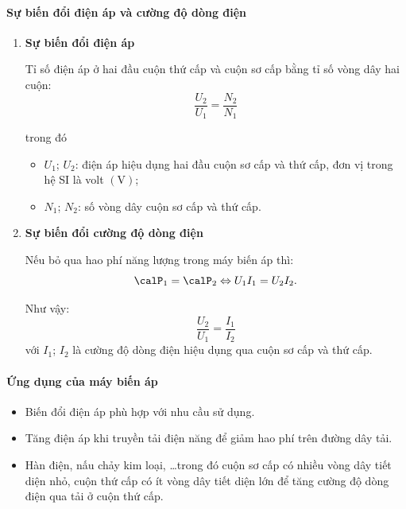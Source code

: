 \begin{tomtat}
	\paragraph{Sự biến đổi điện áp và cường độ dòng điện}
	\begin{enumerate}[label=\bfseries \alph*)]
		\item \textbf{Sự biến đổi điện áp}\\
		\begin{boxdl}
			Tỉ số điện áp ở hai đầu cuộn thứ cấp và cuộn sơ cấp bằng tỉ số vòng dây hai cuộn:
			\begin{equation}
				\dfrac{U_2}{U_1}=\dfrac{N_2}{N_1}
			\end{equation}
		\end{boxdl}
		trong đó
		\begin{itemize}
			\item $U_1$; $U_2$: điện áp hiệu dụng hai đầu cuộn sơ cấp và thứ cấp, đơn vị trong hệ SI là volt $\left(\si{\volt}\right)$;
			\item $N_1$; $N_2$: số vòng dây cuộn sơ cấp và thứ cấp.
		\end{itemize}
		\item \textbf{Sự biến đổi cường độ dòng điện}\\
	\begin{boxdl}
		Nếu bỏ qua hao phí năng lượng trong máy biến áp thì:
		$$\calP_1=\calP_2\Leftrightarrow U_1I_1=U_2I_2.$$
	\end{boxdl}
		Như vậy:
		\begin{equation}
			\dfrac{U_2}{U_1}=\dfrac{I_1}{I_2}
		\end{equation}
		với $I_1$; $I_2$ là cường độ dòng điện hiệu dụng qua cuộn sơ cấp và thứ cấp.
	\end{enumerate}
	\paragraph{Ứng dụng của máy biến áp}
	\begin{itemize}
		\item Biến đổi điện áp phù hợp với nhu cầu sử dụng.
		\item Tăng điện áp khi truyền tải điện năng để giảm hao phí trên đường dây tải.
		\item Hàn điện, nấu chảy kim loại, \dots trong đó cuộn sơ cấp có nhiều vòng dây tiết diện nhỏ, cuộn thứ cấp có ít vòng dây tiết diện lớn để tăng cường độ dòng điện qua tải ở cuộn thứ cấp.
	\end{itemize}

\end{tomtat}
